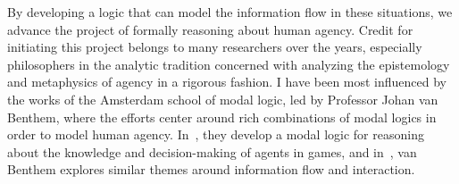 
By developing a logic that can model the information flow in these situations, we advance the project of formally reasoning about human agency. Credit for initiating this project belongs to many researchers over the years, especially philosophers in the analytic tradition concerned with analyzing the epistemology and metaphysics of agency in a rigorous fashion. I have been most influenced by the works of the Amsterdam school of modal logic, led by Professor Johan van Benthem, where the efforts center around rich combinations of modal logics in order to model human agency. In~\cite{VB_TowardPlay}, they develop a modal logic for reasoning about the knowledge and decision-making of agents in games, and in~\cite{VB_LDII}, van Benthem explores similar themes around information flow and interaction. 

